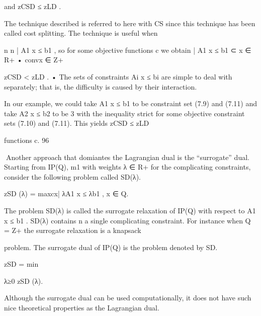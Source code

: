 and zCSD ≤ zLD .

The technique described is referred to here with CS since this technique has been called cost splitting.
The technique is useful when

n
n
| A1 x ≤ b1 , so for some objective functions c we obtain
| A1 x ≤ b1  ⊂ x ∈ R+
• convx ∈ Z+

zCSD < zLD .
• The sets of constraints Ai x ≤ bi are simple to deal with separately; that is, the difficulty is caused
by their interaction.

In our example, we could take A1 x ≤ b1 to be constraint set (7.9) and (7.11) and take A2 x ≤ b2 to be
3
with the inequality strict for some objective
constraint sets (7.10) and (7.11). This yields zCSD ≤ zLD

functions c.
96

Another approach that domiantes the Lagrangian dual is the “surrogate” dual. Starting from IP(Q),
m1
with weights λ ∈ R+
for the complicating constraints, consider the following problem called SD(λ).

zSD (λ) = max{cx| λA1 x ≤ λb1 , x ∈ Q}.

The problem SD(λ) is called the surrogate relaxation of IP(Q) with respect to A1 x ≤ b1 . SD(λ) contains
n
a single complicating constraint. For instance when Q = Z+
the surrogate relaxation is a knapsack

problem. The surrogate dual of IP(Q) is the problem denoted by SD.

zSD = min

λ≥0 zSD (λ).

Although the surrogate dual can be used computationally, it does not have such nice theoretical properties
as the Lagrangian dual.

